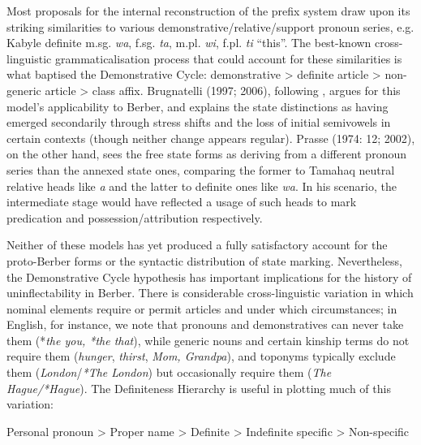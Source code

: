 \documentclass[output=paper]{langscibook}
\begin{document}
\begin{styleStandarduser}
Most proposals for the internal reconstruction of the prefix system draw upon its striking similarities to various demonstrative/relative/support pronoun series, e.g. Kabyle definite m.sg. \textit{wa}, f.sg. \textit{ta}, m.pl. \textit{wi}, f.pl. \textit{ti} “this”. The best-known cross-linguistic grammaticalisation process that could account for these similarities is what \citet{Greenberg1978} baptised the Demonstrative Cycle: demonstrative > definite article > non-generic article > class affix. Brugnatelli (1997; 2006), following \citet{Vycichl1957}, argues for this model’s applicability to Berber, and explains the state distinctions as having emerged secondarily through stress shifts and the loss of initial semivowels in certain contexts (though neither change appears regular). Prasse (1974: 12; 2002), on the other hand, sees the free state forms as deriving from a different pronoun series than the annexed state ones, comparing the former to Tamahaq neutral relative heads like \textit{a} and the latter to definite ones like \textit{wa}. In his scenario, the intermediate stage would have reflected a usage of such heads to mark predication and possession/attribution respectively.
\end{styleStandarduser}

\begin{styleStandarduser}
Neither of these models has yet produced a fully satisfactory account for the proto-Berber forms or the syntactic distribution of state marking. Nevertheless, the Demonstrative Cycle hypothesis has important implications for the history of uninflectability in Berber. There is considerable cross-linguistic variation in which nominal elements require or permit articles and under which circumstances; in English, for instance, we note that pronouns and demonstratives can never take them (*\textit{the you, *the that}), while generic nouns and certain kinship terms do not require them (\textit{hunger}, \textit{thirst}, \textit{Mom, Grandpa}), and toponyms typically exclude them (\textit{London}/\textit{*The London}) but occasionally require them (\textit{The Hague/*Hague}). The Definiteness Hierarchy \citep{Aissen2003} is useful in plotting much of this variation:
\end{styleStandarduser}

\begin{styleStandarduser}
  Personal pronoun > Proper name > Definite > Indefinite specific > Non-specific
\end{styleStandarduser}
\end{document}
